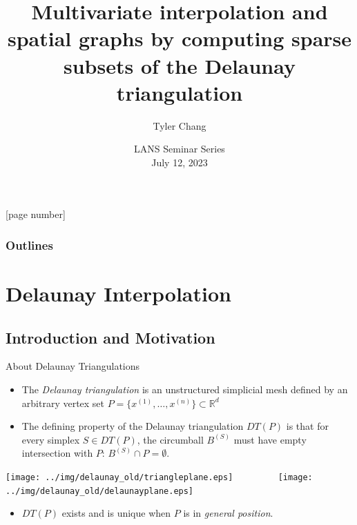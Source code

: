 \documentclass[aspectratio=169]{beamer}
\title{Multivariate interpolation and spatial graphs by computing sparse
subsets of the Delaunay triangulation}
\author{Tyler Chang}
\date{LANS Seminar Series\\
July 12, 2023}
\institute{Argonne National Laboratory}
\newcommand{\cmark}{\ding{51}}
\newcommand{\xmark}{\ding{55}}
\begin{document}
{
\frame{\titlepage}
}

[page number]{}

\begin{frame}
  \frametitle{Outlines}
  \tableofcontents
\end{frame}

\section{Delaunay Interpolation}

\subsection{Introduction and Motivation}
\begin{frame}{About Delaunay Triangulations}
\begin{itemize}
\item The {\it Delaunay triangulation} is an unstructured simplicial mesh
defined by an arbitrary vertex set
$P = \{x^{(1)}, \ldots, x^{(n)}\} \subset \mathbb{R}^d$
\item The defining property of the Delaunay triangulation $DT(P)$ is that
for every simplex $S \in DT(P)$, the circumball $B^{(S)}$
must have empty intersection with $P$:
$B^{(S)} \cap P = \emptyset$.
\end{itemize}
\begin{center}
\texttt{[image: ../img/delaunay\_old/triangleplane.eps]}
\hskip 4pt{\color{red} \xmark}
$\qquad\qquad$
\texttt{[image: ../img/delaunay\_old/delaunayplane.eps]}
\hskip 4pt{\color{green} \cmark}
\end{center}
\begin{itemize}
\item $DT(P)$ exists and is unique when $P$ is in {\it general position}.
\end{itemize}
\end{frame}
\end{document}
